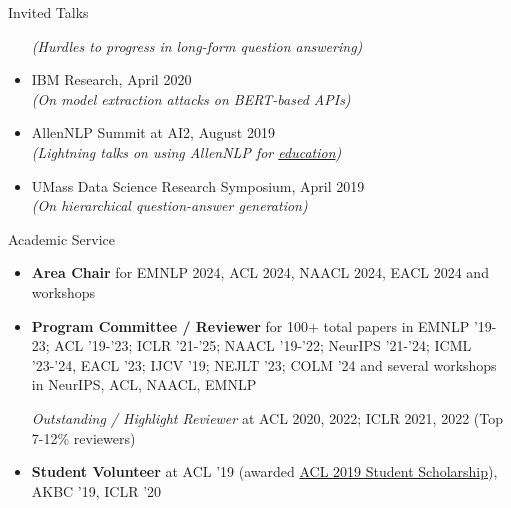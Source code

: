 \documentclass{resume} %
\begin{document}
\begin{rSection}{Invited Talks}
\begin{itemize}[leftmargin=*]
\textit{(Hurdles to progress in long-form question answering)}
\item IBM Research, April 2020\\
\textit{(On model extraction attacks on BERT-based APIs)}
\item AllenNLP Summit at AI2, August 2019 \\
\textit{(Lightning talks on using AllenNLP for \href{https://github.com/martiansideofthemoon/allennlp-probe-hw}{education})}
\item UMass Data Science Research Symposium, April 2019 \\
\textit{(On hierarchical question-answer generation)}
\end{itemize}
\end{rSection}

\pagebreak
\begin{rSection}{Academic Service}
\vspace*{0.1in}
\begin{itemize}[leftmargin=*]

\item \textbf{Area Chair} for EMNLP 2024, ACL 2024, NAACL 2024, EACL 2024 and workshops

\item \textbf{Program Committee / Reviewer} for 100+ total papers in EMNLP '19-23; ACL '19-'23; ICLR '21-'25; NAACL '19-'22; NeurIPS '21-'24; ICML '23-'24, EACL '23; IJCV '19; NEJLT '23; COLM '24 and several workshops in NeurIPS, ACL, NAACL, EMNLP

\emph{Outstanding / Highlight Reviewer} at ACL 2020, 2022; ICLR 2021, 2022  (Top 7-12\% reviewers)

\item \textbf{Student Volunteer} at ACL '19 (awarded \href{http://www.acl2019.org/EN/student-scholarship-applications-volunteers.xhtml}{ACL 2019 Student Scholarship}), AKBC '19, ICLR '20
\end{itemize}
\end{rSection}

\vspace*{0.1in}
\end{document}
